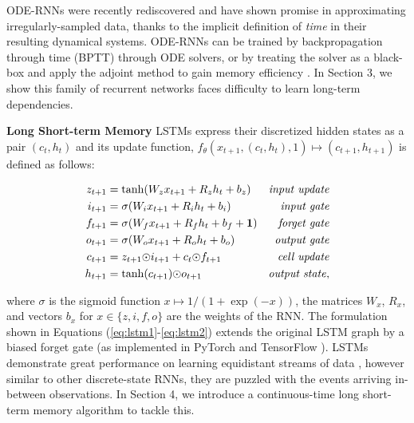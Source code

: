 \documentclass{article}
\begin{document}
ODE-RNNs were recently rediscovered  \cite{rubanova2019latent} and have shown promise in approximating irregularly-sampled data, thanks to the implicit definition of \emph{time} in their resulting dynamical systems. ODE-RNNs can be trained by backpropagation through time (BPTT) \cite{rumelhart1986learning,werbos1988generalization,werbos1990backpropagation} through ODE solvers, or by treating the solver as a black-box and apply the adjoint method \cite{pontryagin2018mathematical} to gain memory efficiency \cite{chen2018neural}. In Section 3, we show this family of recurrent networks faces difficulty to learn long-term dependencies. 

\textbf{Long Short-term Memory   } LSTMs \cite{hochreiter1997long} express their discretized hidden states as a pair $(c_t,h_t)$ and its update function, $f_{\theta}(x_{t+1},(c_t,h_t),1) \mapsto (c_{t+1},h_{t+1})$ is defined as follows:

\begin{align}
    z_{t+1} &= \tanh(W_z x_{t+1} + R_z h_{t} + b_z) & \text{\textit{input update}}\label{eq:lstm1}\\
    i_{t+1} &= \sigma(W_i x_{t+1} + R_i h_{t} + b_i) & \text{\textit{input gate}}\\
    f_{t+1} &= \sigma(W_f x_{t+1} + R_f h_{t} + b_f + \mathbf{1}) & \text{\textit{forget gate}}\label{eq:forget}\\
    o_{t+1} &= \sigma(W_o x_{t+1} + R_o h_{t} + b_o) & \text{\textit{output gate}}\\
    c_{t+1} &= z_{t+1} \elmentwisemul i_{t+1} + c_{t}\elmentwisemul f_{t+1} & \text{\textit{cell update}}\\
    h_{t+1} &= \tanh(c_{t+1}) \elmentwisemul o_{t+1} & \text{\textit{output state}}\label{eq:lstm2},
\end{align}

where $\sigma$ is the sigmoid function $x\mapsto 1/(1+\exp(-x))$, the matrices $W_x$, $R_x$, and vectors $b_x$ for $x\in \{z,i,f,o\}$ are the weights of the RNN. The formulation shown in Equations (\ref{eq:lstm1}-\ref{eq:lstm2}) extends the original LSTM graph by a biased forget gate \cite{gers1999learning} (as implemented in PyTorch \cite{NEURIPS2019_9015} and TensorFlow \cite{tensorflow2015-whitepaper}). LSTMs demonstrate great performance on learning equidistant streams of data \cite{greff2016lstm}, however similar to other discrete-state RNNs, they are puzzled with the events arriving in-between observations. In Section 4, we introduce a continuous-time long short-term memory algorithm to tackle this.
\end{document}
